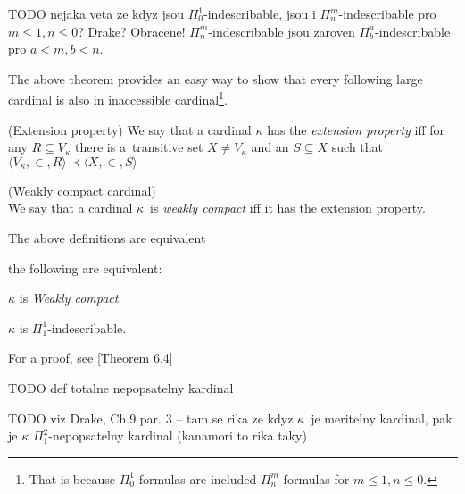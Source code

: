 TODO nejaka veta ze kdyz jsou $\Pi^1_0$-indescribable, jsou i $\Pi^m_n$-indescribable pro $m \leq 1, n \leq 0$? Drake? Obracene! $\Pi^m_n$-indescribable jsou zaroven $\Pi^a_b$-indescribable pro $a < m, b < n$.

The above theorem provides an easy way to show that every following large cardinal is also in inaccessible cardinal\footnote{That is because $\Pi^1_0$ formulas are included $\Pi^m_n$ formulas for $m \leq 1, n \leq 0$.}.


\begin{definition}{(Extension property)}
We say that a cardinal $\kappa$ has the \emph{extension property} iff for any $R \subseteq V_\kappa$ there is a~transitive set 
$X \neq V_\kappa$ and an $S \subseteq X$ such that 
$\langle V_\kappa, \in, R \rangle \prec \langle X, \in, S \rangle$
\end{definition}


\begin{definition}{(Weakly compact cardinal)}\label{def:weakly_compact_extension}\\
We say that a cardinal $\kappa$ is \emph{weakly compact} iff it has the extension property.
\end{definition}


The above definitions are equivalent

\begin{theorem}
the following are equivalent:\\
\bce[(i)]
\item $\kappa$ is \emph{Weakly compact}.
\item $\kappa$ is $\Pi^1_1$-indescribable.
\ece
\end{theorem}

For a proof, see \cite{KanamoriBook}[Theorem 6.4]

TODO def totalne nepopsatelny kardinal


TODO viz Drake, Ch.9 par. 3 -- tam se rika ze kdyz $\kappa$ je meritelny kardinal, pak je $\kappa$ $\Pi^2_1$-nepopsatelny kardinal (kanamori to rika taky)

